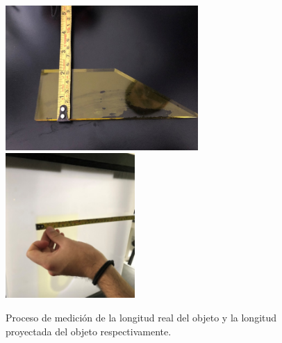 \documentclass[12pt,a4paper]{article}
\begin{document}
\begin{figure}[ht]
	\centering
	\includegraphics[height = 5.5cm]{IMAGENES/images/image1} \hspace{8mm}
	\includegraphics[height = 5.5cm]{IMAGENES/images/image8}
	\caption{Proceso de medición de la longitud real del objeto y la longitud proyectada del objeto respectivamente.}
	\label{fig_2}
\end{figure}\\
\end{document}
